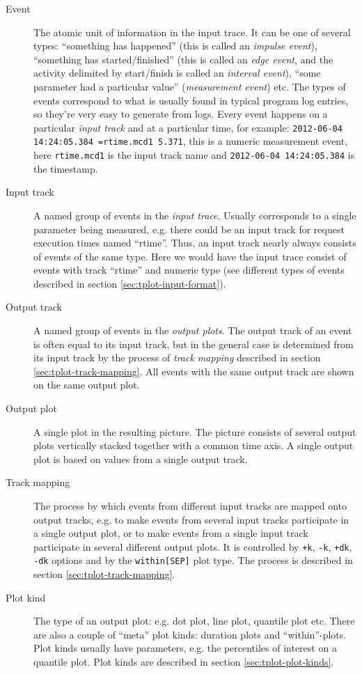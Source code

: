 \documentclass{article}
\begin{document}
\begin{description}
\item[Event] The atomic unit of information in the input trace. It can be one of several types: ``something has happened'' (this is called an \emph{impulse event}), ``something has started/finished'' (this is called an \emph{edge event}, and the activity delimited by start/finish is called an \emph{interval event}), ``some parameter had a particular value'' (\emph{measurement event}) etc. The types of events correspond to what is usually found in typical program log entries, so they're very easy to generate from logs. Every event happens on a particular \emph{input track} and at a particular time, for example: \verb|2012-06-04 14:24:05.384 =rtime.mcd1 5.371|, this is a numeric measurement event, here \verb|rtime.mcd1| is the input track name and \verb|2012-06-04 14:24:05.384| is the timestamp.
\item[Input track] A named group of events in the \emph{input trace}. Usually corresponds to a single parameter being measured, e.g. there could be an input track for request execution times named ``rtime''. Thus, an input track nearly always consists of events of the same type. Here we would have the input trace consist of events with track ``rtime'' and numeric type (see different types of events described in section \ref{sec:tplot-input-format}).
\item[Output track] A named group of events in the \emph{output plots}. The output track of an event is often equal to its input track, but in the general case is determined from its input track by the process of \emph{track mapping} described in section \ref{sec:tplot-track-mapping}. All events with the same output track are shown on the same output plot.
\item[Output plot] A single plot in the resulting picture. The picture consists of several output plots vertically stacked together with a common time axis. A single output plot is based on values from a single output track.
\item[Track mapping] The process by which events from different input tracks are mapped onto output tracks, e.g. to make events from several input tracks participate in a single output plot, or to make events from a single input track participate in several different output plots. It is controlled by \verb|+k|, \verb|-k|, \verb|+dk|, \verb|-dk| options and by the \verb|within[SEP]| plot type. The process is described in section \ref{sec:tplot-track-mapping}.
\item[Plot kind] The type of an output plot: e.g. dot plot, line plot, quantile plot etc. There are also a couple of ``meta'' plot kinds: duration plots and ``within''-plots. Plot kinds usually have parameters, e.g. the percentiles of interest on a quantile plot. Plot kinds are described in section \ref{sec:tplot-plot-kinds}.

\end{description}
\end{document}
